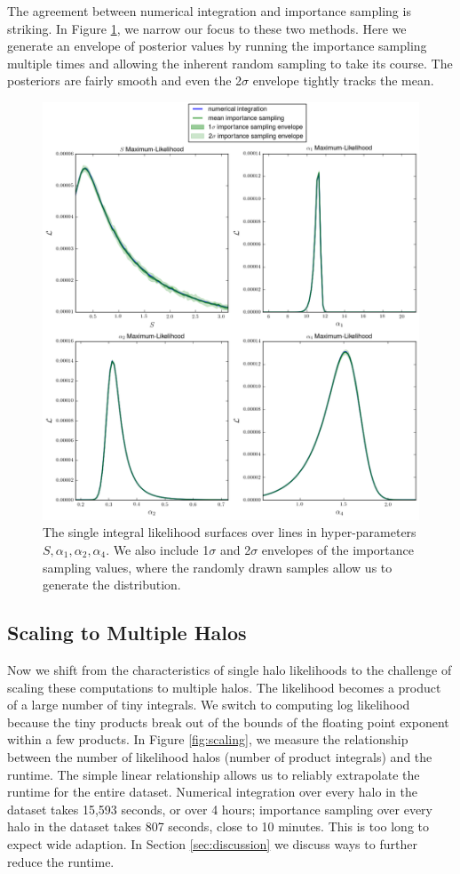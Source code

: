 \documentclass[\docopts]{\docclass}
\begin{document}
The agreement between numerical integration and importance sampling is striking.
In Figure \ref{fig:posterior_is}, we narrow our focus to these two methods.
Here we generate an envelope of posterior values by running the importance sampling multiple times and allowing the inherent random sampling to take its course.
The posteriors are fairly smooth and even the 2$\sigma$ envelope tightly tracks the mean.

\begin{figure}[!h]
\centering
\includegraphics[width=0.9\columnwidth]{posterior_is.png}
\caption{
The single integral likelihood surfaces over lines in hyper-parameters $S, \alpha_1, \alpha_2, \alpha_4$.
We also include 1$\sigma$ and 2$\sigma$ envelopes of the importance sampling values, where the randomly drawn samples allow us to generate the distribution.
\label{fig:posterior_is}}
\end{figure}

\subsection{Scaling to Multiple Halos}

Now we shift from the characteristics of single halo likelihoods to the challenge of scaling these computations to multiple halos. 
The likelihood becomes a product of a large number of tiny integrals.
We switch to computing log likelihood because the tiny products break out of the bounds of the floating point exponent within a few products.
In Figure \ref{fig:scaling}, we measure the relationship between the number of likelihood halos (number of product integrals) and the runtime.
The simple linear relationship allows us to reliably extrapolate the runtime for the entire dataset.
Numerical integration over every halo in the dataset takes 15,593 seconds, or over 4 hours; importance sampling over every halo in the dataset takes 807 seconds, close to 10 minutes.
This is too long to expect wide adaption.
In Section \ref{sec:discussion} we discuss ways to further reduce the runtime.
\end{document}
